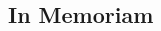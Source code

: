 \documentclass[class=book, crop=false]{standalone}
\begin{document}
\begin{CJK}{UTF8}{gbsn}

\chapter{In Memoriam}



\cleardoublepage

\end{CJK}
\end{document}
